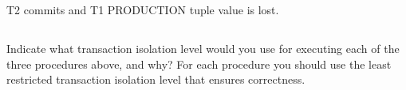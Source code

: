 T2 commits and T1 PRODUCTION tuple value is lost. 

\subsection{}
{\color{gray}Indicate what transaction isolation level would you use for executing each of the three procedures above, and why? For each procedure you should use the least restricted transaction isolation level that ensures correctness.}
